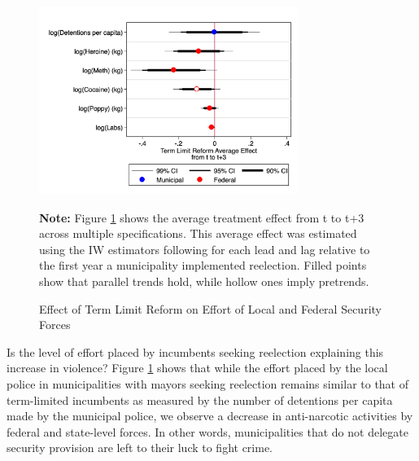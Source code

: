 \documentclass[12pt]{amsart}
\makeatletter
\def\section{\@startsection{section}{1}
	\z@{1.0\linespacing\@plus\linespacing}{.5\linespacing}{\Large}}
\numberwithin{equation}{section}
\theoremstyle{definition}
\theoremstyle{definition}
\theoremstyle{definition}
\makeatother
\begin{document}
\begin{figure}[H]  
\centering
\caption{Effect of Term Limit Reform on Effort of Local and Federal Security Forces} 
\label{fig:effort}

   
\includegraphics[width=0.75\textwidth]{Figures/effort.png}
  
 \textbf{Note:} Figure \ref{fig:effort} shows the average treatment effect from t to t+3 across multiple specifications. This average effect was estimated using the IW estimators following \citet{abraham_sun_2020} for each lead and lag relative to the first year a municipality implemented reelection. Filled points show that parallel trends hold, while hollow ones imply pretrends.        
\end{figure} 


Is the level of effort placed by incumbents seeking reelection explaining this increase in violence? Figure \ref{fig:effort} shows that while the effort placed by the local police in municipalities with mayors seeking reelection remains similar to that of term-limited incumbents as measured by the number of detentions per capita made by the municipal police, we observe a decrease in anti-narcotic activities by federal and state-level forces. In other words, municipalities that do not delegate security provision are left to their luck to fight crime. 


 
\section{Conclusion \label{sec:conclusion}}
\end{document}
